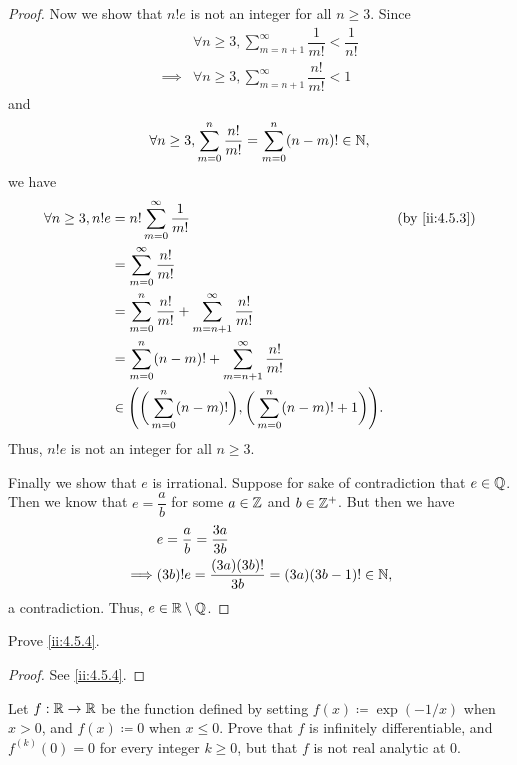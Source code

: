 \begin{proof}
  Now we show that \(n! e\) is not an integer for all \(n \geq 3\).
  Since
  \begin{align*}
             & \forall n \geq 3, \sum_{m = n + 1}^\infty \dfrac{1}{m!} < \dfrac{1}{n!} \\
    \implies & \forall n \geq 3, \sum_{m = n + 1}^\infty \dfrac{n!}{m!} < 1
  \end{align*}
  and
  \[
    \forall n \geq 3, \sum_{m = 0}^n \dfrac{n!}{m!} = \sum_{m = 0}^n (n - m)! \in \mathbb{N},
  \]
  we have
  \begin{align*}
    \forall n \geq 3, n! e & = n! \sum_{m = 0}^\infty \dfrac{1}{m!}                                                        &  & \by{ii:4.5.3} \\
                           & = \sum_{m = 0}^\infty \dfrac{n!}{m!}                                                                             \\
                           & = \sum_{m = 0}^n \dfrac{n!}{m!} + \sum_{m = n + 1}^\infty \dfrac{n!}{m!}                                         \\
                           & = \sum_{m = 0}^n (n - m)! + \sum_{m = n + 1}^\infty \dfrac{n!}{m!}                                               \\
                           & \in \Bigg(\bigg(\sum_{m = 0}^n (n - m)!\bigg), \bigg(\sum_{m = 0}^n (n - m)! + 1\bigg)\Bigg).
  \end{align*}
  Thus, \(n! e\) is not an integer for all \(n \geq 3\).

  Finally we show that \(e\) is irrational.
  Suppose for sake of contradiction that \(e \in \mathbb{Q}\).
  Then we know that \(e = \dfrac{a}{b}\) for some \(a \in \mathbb{Z}\) and \(b \in \mathbb{Z}^+\).
  But then we have
  \begin{align*}
             & e = \dfrac{a}{b} = \dfrac{3a}{3b}                         \\
    \implies & (3b)! e = \dfrac{(3a) (3b)!}{3b} = (3a) (3b - 1)! \in \mathbb{N},
  \end{align*}
  a contradiction.
  Thus, \(e \in \mathbb{R} \setminus \mathbb{Q}\).
\end{proof}

\begin{ex}\label{ii:ex:4.5.3}
  Prove \cref{ii:4.5.4}.
\end{ex}

\begin{proof}
  See \cref{ii:4.5.4}.
\end{proof}

\begin{ex}\label{ii:ex:4.5.4}
  Let \(f : \mathbb{R} \to \mathbb{R}\) be the function defined by setting \(f(x) \coloneqq \exp(-1 / x)\) when \(x > 0\), and \(f(x) \coloneqq 0\) when \(x \leq 0\).
  Prove that \(f\) is infinitely differentiable, and \(f^{(k)}(0) = 0\) for every integer \(k \geq 0\), but that \(f\) is not real analytic at \(0\).
\end{ex}

